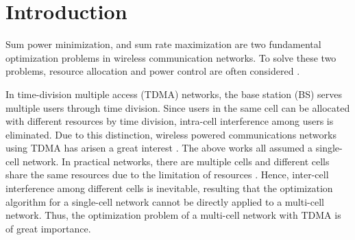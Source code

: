 \documentclass[journal]{IEEEtran}
\begin{document}
\IEEEpeerreviewmaketitle


\section{Introduction}
Sum power minimization, and sum rate maximization are two fundamental optimization problems in wireless communication networks.
To solve these two problems, resource allocation and power control are often considered \cite{793310,1244793,1545851,6936359,6815733,4289518,Georgiadis2006Resource,6826535}.

In time-division multiple access (TDMA) networks, the base station (BS) serves multiple users through time division.
Since users in the same cell can be allocated with different resources by time division, intra-cell interference among users is eliminated.
Due to this distinction, wireless powered communications networks using TDMA has arisen a great interest \cite{6678102,7328715,7098429,7037291}.
The above works all assumed a single-cell network.
In practical networks, there are multiple cells and different cells share the same resources due to the limitation of resources \cite{6824752,Pan2015Totally,Pan2016Pricing}.
Hence, inter-cell interference among different cells is inevitable, resulting that the optimization algorithm for a single-cell network cannot be directly applied to a multi-cell network.
Thus, the optimization problem of a multi-cell network with TDMA is of great importance.
\end{document}
